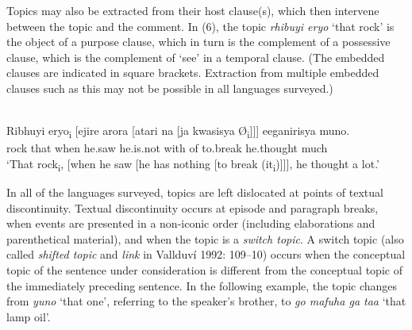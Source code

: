\documentclass[output=paper]{langsci/langscibook}
\begin{document}

Topics may also be extracted from their host clause(s), which then intervene between the topic and the comment. In (6), the topic \textit{rhibuyi eryo} ‘that rock’ is the object of a purpose clause, which in turn is the complement of a possessive clause, which is the complement of ‘see’ in a temporal clause. (The embedded clauses are indicated in square brackets. Extraction from multiple embedded clauses such as this may not be possible in all languages surveyed.)

\ea\label{ex:}
\\
\gll Ribhuyi eryo\textsubscript{i} [ejire arora [atari na [ja kwasisya Ø\textsubscript{i}]]] eeganirisya muno.\\
rock that when he.saw he.is.not with of to.break he.thought much\\

\glt \textup{‘}\textup{That rock}\textsubscript{i}\textup{, [when he saw [he has nothing [to break (it}\textsubscript{i}\textup{)]]], he thought a}\textup{ lot.’}
\z

In all of the languages surveyed, topics are left dislocated at points of textual discontinuity. Textual discontinuity occurs at episode and paragraph breaks, when events are presented in a non-iconic order (including elaborations and parenthetical material), and when the topic is a \textit{switch topic}. A switch topic (also called \textit{shifted topic} and \textit{link} in Vallduví 1992: 109–10) occurs when the conceptual topic of the sentence under consideration is different from the conceptual topic of the immediately preceding sentence. In the following example, the topic changes from \textit{yuno} ‘that one’, referring to the speaker’s brother, to \textit{go mafuha ga taa} ‘that lamp oil’.
\end{document}

